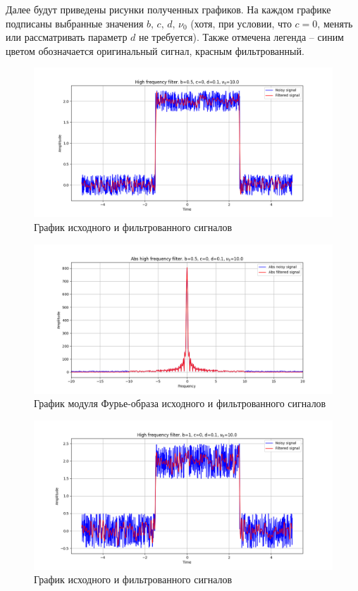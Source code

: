 \documentclass[a4paper, 12pt]{article}
\begin{document}
    
    Далее будут приведены рисунки полученных графиков. На каждом графике подписаны выбранные значения $b,\,c,\,d,\,\nu_0$
    (хотя, при условии, что $c=0$, менять или рассматривать параметр $d$ не требуется). Также отмечена легенда -- синим цветом
    обозначается оригинальный сигнал, красным фильтрованный.
    \begin{figure}[!htb]
        \centering
        \includegraphics[scale=0.485]{1_u_flt_u_nohigh.png}
        \captionsetup{skip=0pt}
        \caption{График исходного и фильтрованного сигналов}
        \label{fig:fig1}
    \end{figure}
    \begin{figure}[!htb]
        \centering
        \includegraphics[scale=0.485]{1_abs_u_U_nohigh.png}
        \captionsetup{skip=0pt}
        \caption{График модуля Фурье-образа исходного и фильтрованного сигналов}
        \label{fig:fig2}
    \end{figure}
    \begin{figure}[!htb]
        \centering
        \includegraphics[scale=0.485]{2_u_flt_u_nohigh.png}
        \captionsetup{skip=0pt}
        \caption{График исходного и фильтрованного сигналов}
        \label{fig:fig3}
    \end{figure}
\end{document}
